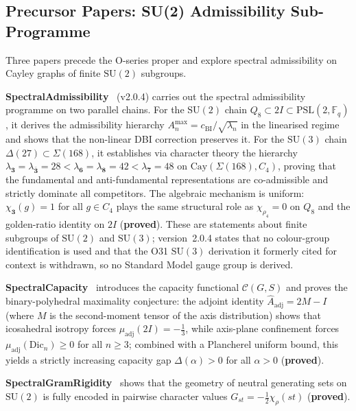 \documentclass[11pt,a4paper]{article}
\newcommand{\SU}{\mathrm{SU}}
\newcommand{\sproved}{\textcolor{cproved}{\textbf{proved}}}
\begin{document}
  \subsection{Precursor Papers: SU(2) Admissibility Sub-Programme}

    Three papers precede the O-series proper and explore spectral admissibility on Cayley graphs
    of finite $\SU(2)$ subgroups.

    \textbf{SpectralAdmissibility}~\cite{Beau2026a1} (v2.0.4) carries out the spectral admissibility
    programme on two parallel chains.
    For the $\mathrm{SU}(2)$ chain $Q_8 \subset 2I \subset \mathrm{PSL}(2,\mathbb{F}_q)$, it derives
    the admissibility hierarchy $A^{\max}_n = c_{\mathrm{BI}}/\sqrt{\lambda_n}$ in the linearised regime and
    shows that the non-linear DBI correction preserves it.
    For the $\mathrm{SU}(3)$ chain $\Delta(27) \subset \Sigma(168)$, it establishes via character
    theory the hierarchy
    $\lambda_{\mathbf{3}} = \lambda_{\bar{\mathbf{3}}} = 28 < \lambda_{\mathbf{6}} = \lambda_{\mathbf{8}}
    = 42 < \lambda_{\mathbf{7}} = 48$
    on $\mathrm{Cay}(\Sigma(168), C_4)$, proving that the fundamental and anti-fundamental
    representations are co-admissible and strictly dominate all competitors.
    The algebraic mechanism is uniform: $\chi_{\mathbf{3}}(g) = 1$ for all $g \in C_4$ plays the
    same structural role as $\chi_{\rho_4} = 0$ on $Q_8$ and the golden-ratio identity on $2I$
    (\sproved).
    These are statements about finite subgroups of $\mathrm{SU}(2)$ and $\mathrm{SU}(3)$; version~2.0.4
    states that no colour-group identification is used and that the O31 $\mathrm{SU}(3)$ derivation it
    formerly cited for context is withdrawn, so no Standard Model gauge group is derived.

    \textbf{SpectralCapacity}~\cite{Beau2026a2} introduces the capacity functional $\mathcal{C}(G,S)$
    and proves the binary-polyhedral maximality conjecture: the adjoint identity
    $\hat{A}_{\mathrm{adj}} = 2M - I$ (where $M$ is the second-moment tensor of the axis distribution)
    shows that icosahedral isotropy forces $\mu_{\mathrm{adj}}(2I) = -\tfrac{1}{3}$,
    while axis-plane confinement forces $\mu_{\mathrm{adj}}(\mathrm{Dic}_n) \geq 0$ for all $n \geq 3$;
    combined with a Plancherel uniform bound, this yields a strictly increasing capacity gap
    $\Delta(\alpha) > 0$ for all $\alpha > 0$ (\sproved).

    \textbf{SpectralGramRigidity}~\cite{Beau2026a3} shows that the geometry of neutral
    generating sets on $\SU(2)$ is fully encoded in pairwise character values
    $G_{st} = -\tfrac{1}{2}\chi_\rho(st)$ (\sproved).
\end{document}
